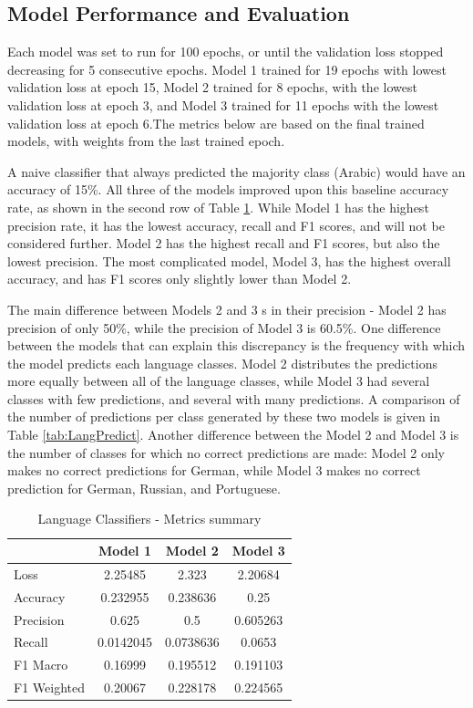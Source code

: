 \subsection{Model Performance and Evaluation}

Each model was set to run for 100 epochs, or until the validation loss stopped decreasing for 5 consecutive epochs. Model 1 trained for 19 epochs with lowest validation loss at epoch 15, Model 2 trained for 8 epochs, with the lowest validation loss at epoch 3, and Model 3 trained for 11 epochs with the lowest validation loss at epoch 6.The metrics below are based on the final trained models, with weights from the last trained epoch.

A naive classifier that always predicted the majority class (Arabic) would have an accuracy of 15\%.  All three of the models improved upon this baseline accuracy rate, as shown in the second row of Table \ref{tab:LangMetricsSum}. While Model 1 has the highest precision rate, it has the lowest accuracy, recall and F1 scores, and will not be considered further. Model 2 has the highest recall and F1 scores, but also the lowest precision. The most complicated model, Model 3, has the highest overall accuracy, and has F1 scores only slightly lower than Model 2. 

The main difference between Models 2 and 3 s in their precision - Model 2 has precision of only 50\%, while the precision of Model 3 is 60.5\%. One difference between the models that can explain this discrepancy is the frequency with which the model predicts each language classes. Model 2 distributes the predictions more equally between all of the language classes, while Model 3 had several classes with few predictions, and several with many predictions. A comparison of the number of predictions per class generated by these two models is given in Table \ref{tab:LangPredict}.  Another difference between the Model 2 and Model 3 is the number of classes for which no correct predictions are made: Model 2 only makes no correct predictions for German, while Model 3 makes no correct prediction for German, Russian, and Portuguese.

\begin{table}[h]
\begin{center}
\caption{Language Classifiers - Metrics summary}
\begin{tabular}{l c c c}
		&Model 1		&Model 2		&Model 3 \\ \hline
Loss		&2.25485		&2.323		&2.20684 \\
Accuracy	&0.232955	&0.238636	&0.25\\
Precision	&0.625		&0.5			&0.605263\\
Recall	&0.0142045	&0.0738636	&0.0653 \\ 

F1 Macro	&0.16999		&0.195512	&0.191103\\
F1 Weighted	&0.20067	&0.228178	&0.224565\\
\end{tabular}
\label{tab:LangMetricsSum} 
\end{center}
\end{table} 


